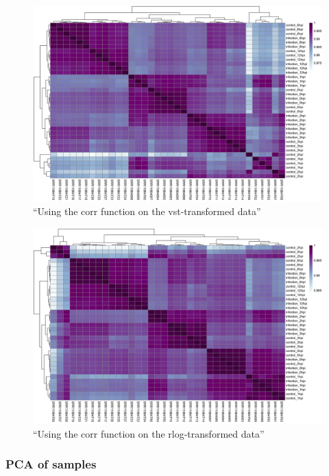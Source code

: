 \documentclass[
]{book}
\begin{document}
\begin{figure}
\centering
\includegraphics{images/heatmap_sampleCorr_Vst.png}
\caption{``Using the corr function on the vst-transformed data''}
\end{figure}

\begin{figure}
\centering
\includegraphics{images/heatmap_sampleCorr_Rlog.png}
\caption{``Using the corr function on the rlog-transformed data''}
\end{figure}

\hypertarget{pca-of-samples}{%
\subsubsection{PCA of samples}\label{pca-of-samples}}
\end{document}
